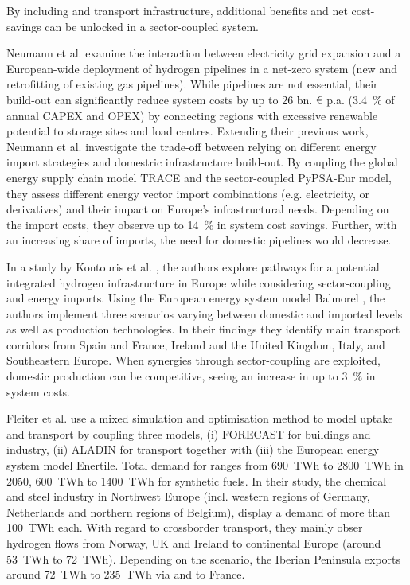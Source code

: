 \documentclass[preprint,12pt,sort&compress]{elsarticle}
\begin{document}
By including  and  transport infrastructure, additional benefits and net cost-savings can be unlocked in a sector-coupled system.

Neumann et al. \cite{neumannPotentialRoleHydrogen2023} examine the interaction between electricity grid expansion and a European-wide deployment of hydrogen pipelines in a net-zero system (new and retrofitting of existing gas pipelines). While  pipelines are not essential, their build-out can significantly reduce system costs by up to 26 bn. \euro{} p.a. (\SI{3.4}{\percent} of annual CAPEX and OPEX) by connecting regions with excessive renewable potential to storage sites and load centres. 
Extending their previous work, Neumann et al. \cite{neumannEnergyImportsInfrastructure2024} investigate the trade-off between relying on different energy import strategies and domestric infrastructure build-out. By coupling the global energy supply chain model TRACE \cite{hamppImportOptionsChemical2023} and the sector-coupled PyPSA-Eur model, they assess different energy vector import combinations (e.g. electricity,  or  derivatives) and their impact on Europe's infrastructural needs. Depending on the import costs, they observe up to \SI{14}{\percent} in system cost savings. Further, with an increasing share of  imports, the need for domestic  pipelines would decrease. 

In a study by Kontouris et al. \cite{kountourisUnifiedEuropeanHydrogen2024}, the authors explore pathways for a potential integrated hydrogen infrastructure in Europe while considering sector-coupling and energy imports. Using the European energy system model Balmorel \cite{wieseBalmorelOpenSource2018}, the authors implement three scenarios varying between domestic and imported  levels as well as  production technologies. In their findings they identify main  transport corridors from Spain and France, Ireland and the United Kingdom, Italy, and Southeastern Europe. When synergies through sector-coupling are exploited, domestic  production can be competitive, seeing an increase in up to \SI{3}{\percent} in system costs.

Fleiter et al. \cite{fleiterHydrogenInfrastructureFuture2025} use a mixed simulation and optimisation method to model  uptake and transport by coupling three models, (i) FORECAST for buildings and industry, (ii) ALADIN for transport together with (iii) the European energy system model Enertile. Total demand for  ranges from \SI{690}{TWh} to \SI{2800}{TWh} in 2050, \SI{600}{TWh} to \SI{1400}{TWh} for synthetic fuels. In their study, the  chemical and steel industry in Northwest Europe (incl. western regions of Germany, Netherlands and northern regions of Belgium), display a demand of more than \SI{100}{TWh} each. With regard to crossborder transport, they mainly obser hydrogen flows from Norway, UK and Ireland to continental Europe (around \SI{53}{TWh} to \SI{72}{TWh}). Depending on the scenario, the Iberian Peninsula exports around \SI{72}{TWh} to \SI{235}{TWh} via and to France.
\end{document}
